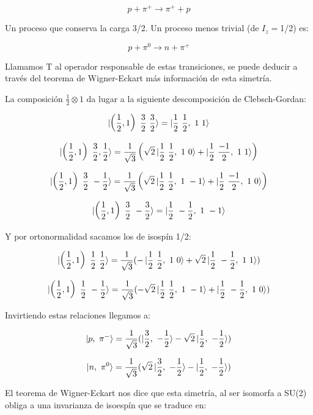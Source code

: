 \documentclass{article}
\begin{document}
        $$p + \pi ^+ \to \pi ^+ + p$$

        Un proceso que conserva la carga 3/2. Un proceso menos trivial (de $I_z=$1/2) es:

        $$p + \pi ^0 \to n + \pi ^+$$

        Llamamos T al operador responsable de estas transiciones, se puede deducir a través del teorema de Wigner-Eckart más información de esta simetría.

        \smallskip
        La composición $\frac{1}{2}\otimes 1$ da lugar a la siguiente descomposición de Clebsch-Gordan:

        $$\ket{\left ( \frac{1}{2},1\right) \ \frac{3}{2} \ \frac{3}{2}}=\ket{\frac{1}{2} \ \frac{1}{2} , \ 1 \ 1}$$

        $$\ket{\left ( \frac{1}{2},1\right) \ \frac{3}{2}, \frac{1}{2}}= \frac{1}{\sqrt{3}}\left ( \sqrt{2} \ket{\frac{1}{2} \ \frac{1}{2}, \ 1 \ 0 } + \ket{\frac{1}{2} \ \frac{-1}{2} , \ 1 \ 1}\right)$$

        $$\ket{\left ( \frac{1}{2},1\right) \ \frac{3}{2} \ -\frac{1}{2}}= \frac{1}{\sqrt{3}}\left ( \sqrt{2} \ket{\frac{1}{2} \ \frac{1}{2}, \ 1 \ -1} + \ket{\frac{1}{2} \ \frac{-1}{2} , \ 1 \ 0}\right)$$

        $$\ket{\left ( \frac{1}{2},1\right) \ \frac{3}{2} \ -\frac{3}{2}}=\ket{\frac{1}{2} \ -\frac{1}{2} , \ 1 \ -1}$$

        Y por ortonormalidad sacamos los de isospín 1/2:

        $$\ket{\left ( \frac{1}{2},1\right) \ \frac{1}{2} \ \frac{1}{2}}= \frac{1}{\sqrt{3}}(-\ket{\frac{1}{2} \ \frac{1}{2} ,\ 1 \ 0} + \sqrt{2} \ket{\frac{1}{2} \ -\frac{1}{2} ,\ 1 \ 1})$$

        $$\ket{\left ( \frac{1}{2},1\right) \ \frac{1}{2} \ -\frac{1}{2}}= \frac{1}{\sqrt{3}}(-\sqrt{2}\ket{\frac{1}{2} \ \frac{1}{2} ,\ 1 \ -1} + \ket{\frac{1}{2} \ -\frac{1}{2} ,\ 1 \ 0})$$

        Invirtiendo estas relaciones llegamos a:

        $$\ket{p, \ \pi ^-}=\frac{1}{\sqrt{3}}(\ket{\frac{3}{2},\ -\frac{1}{2}} - \sqrt{2} \ket{\frac{1}{2}, \ -\frac{1}{2}})$$

        $$\ket{n, \ \pi ^0}=\frac{1}{\sqrt{3}}(\sqrt{2}\ket{\frac{3}{2},\ -\frac{1}{2}} -\ket{\frac{1}{2}, \ -\frac{1}{2}})$$

        El teorema de Wigner-Eckart nos dice que esta simetría, al ser isomorfa a SU(2) obliga a una invarianza de isoespín que se traduce en:
\end{document}
